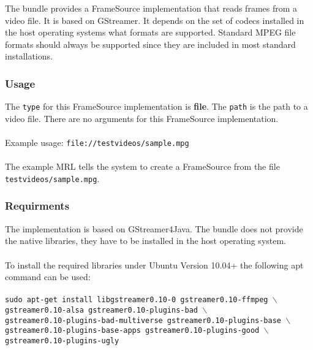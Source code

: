 
The bundle provides a FrameSource implementation that reads frames from a video file. It is based on GStreamer. It depends on the set of codecs installed in the host operating systems what formats are supported. Standard MPEG file formats should always be supported since they are included in most standard installations. 

\subsubsection{Usage}

The \texttt{type} for this FrameSource implementation is \textbf{file}. The \texttt{path} is the path to a video file. There are no arguments for this FrameSource implementation. 
\\~\\
Example usage: \hspace{30pt} \texttt{file://testvideos/sample.mpg}
\\~\\
The example MRL tells the system to create a FrameSource from the file \texttt{testvideos/sample.mpg}.

\subsubsection{Requirments}

The implementation is based on GStreamer4Java. The bundle does not provide the native libraries, they have to be installed in the host operating system.
\\~\\
To install the required libraries under Ubuntu Version 10.04+ the following apt command can be used:
\\~\\
\texttt{sudo apt-get install libgstreamer0.10-0 gstreamer0.10-ffmpeg $\backslash$ \\
gstreamer0.10-alsa gstreamer0.10-plugins-bad $\backslash$ \\
gstreamer0.10-plugins-bad-multiverse gstreamer0.10-plugins-base $\backslash$ \\
gstreamer0.10-plugins-base-apps gstreamer0.10-plugins-good $\backslash$ \\
gstreamer0.10-plugins-ugly}
